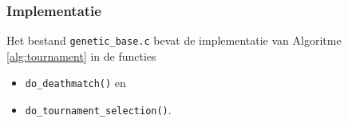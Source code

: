 
\subsubsection{Implementatie}
Het bestand \texttt{genetic\_base.c} bevat de implementatie van Algoritme \ref{alg:tournament} in de functies \begin{itemize}
  \setlength{\itemsep}{1pt}
  \setlength{\parskip}{0pt}
  \setlength{\parsep}{0pt}
\item\texttt{do\_deathmatch()} en
\item\texttt{do\_tournament\_selection()}.
 \end{itemize}  
